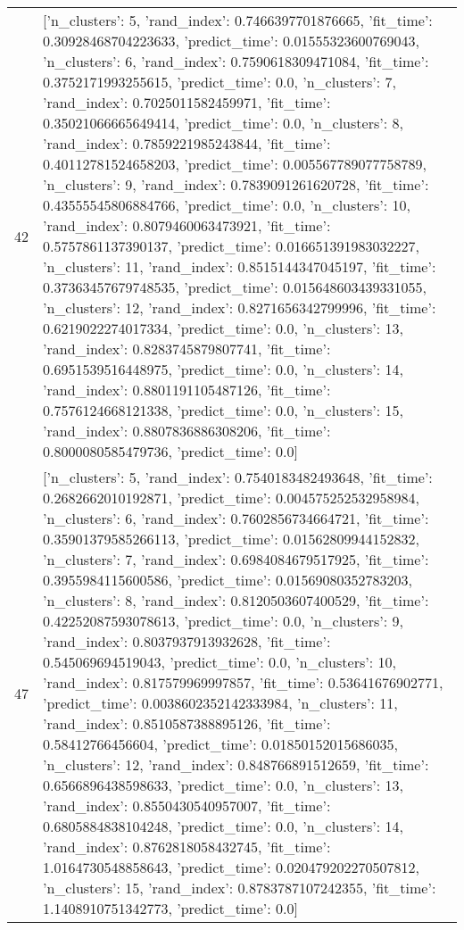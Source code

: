 \begin{tabular}{rl}
42 & [{'n_clusters': 5, 'rand_index': 0.7466397701876665, 'fit_time': 0.30928468704223633, 'predict_time': 0.01555323600769043}, {'n_clusters': 6, 'rand_index': 0.7590618309471084, 'fit_time': 0.3752171993255615, 'predict_time': 0.0}, {'n_clusters': 7, 'rand_index': 0.7025011582459971, 'fit_time': 0.35021066665649414, 'predict_time': 0.0}, {'n_clusters': 8, 'rand_index': 0.7859221985243844, 'fit_time': 0.40112781524658203, 'predict_time': 0.005567789077758789}, {'n_clusters': 9, 'rand_index': 0.7839091261620728, 'fit_time': 0.43555545806884766, 'predict_time': 0.0}, {'n_clusters': 10, 'rand_index': 0.8079460063473921, 'fit_time': 0.5757861137390137, 'predict_time': 0.016651391983032227}, {'n_clusters': 11, 'rand_index': 0.8515144347045197, 'fit_time': 0.37363457679748535, 'predict_time': 0.015648603439331055}, {'n_clusters': 12, 'rand_index': 0.8271656342799996, 'fit_time': 0.6219022274017334, 'predict_time': 0.0}, {'n_clusters': 13, 'rand_index': 0.8283745879807741, 'fit_time': 0.6951539516448975, 'predict_time': 0.0}, {'n_clusters': 14, 'rand_index': 0.8801191105487126, 'fit_time': 0.7576124668121338, 'predict_time': 0.0}, {'n_clusters': 15, 'rand_index': 0.8807836886308206, 'fit_time': 0.8000080585479736, 'predict_time': 0.0}] \\
47 & [{'n_clusters': 5, 'rand_index': 0.7540183482493648, 'fit_time': 0.2682662010192871, 'predict_time': 0.004575252532958984}, {'n_clusters': 6, 'rand_index': 0.7602856734664721, 'fit_time': 0.35901379585266113, 'predict_time': 0.01562809944152832}, {'n_clusters': 7, 'rand_index': 0.6984084679517925, 'fit_time': 0.3955984115600586, 'predict_time': 0.01569080352783203}, {'n_clusters': 8, 'rand_index': 0.8120503607400529, 'fit_time': 0.42252087593078613, 'predict_time': 0.0}, {'n_clusters': 9, 'rand_index': 0.8037937913932628, 'fit_time': 0.545069694519043, 'predict_time': 0.0}, {'n_clusters': 10, 'rand_index': 0.817579969997857, 'fit_time': 0.53641676902771, 'predict_time': 0.0038602352142333984}, {'n_clusters': 11, 'rand_index': 0.8510587388895126, 'fit_time': 0.58412766456604, 'predict_time': 0.01850152015686035}, {'n_clusters': 12, 'rand_index': 0.848766891512659, 'fit_time': 0.6566896438598633, 'predict_time': 0.0}, {'n_clusters': 13, 'rand_index': 0.8550430540957007, 'fit_time': 0.6805884838104248, 'predict_time': 0.0}, {'n_clusters': 14, 'rand_index': 0.8762818058432745, 'fit_time': 1.0164730548858643, 'predict_time': 0.020479202270507812}, {'n_clusters': 15, 'rand_index': 0.8783787107242355, 'fit_time': 1.1408910751342773, 'predict_time': 0.0}] \\

\end{tabular}
